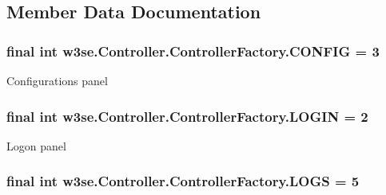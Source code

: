 \subsection{Member Data Documentation}
\hypertarget{classw3se_1_1_controller_1_1_controller_factory_ae4a2c6a73c4e48952bbace51e7ab0c03}{
\subsubsection[{C\-O\-N\-F\-I\-G}]{\setlength{\rightskip}{0pt plus 5cm}final int w3se.\-Controller.\-Controller\-Factory.\-C\-O\-N\-F\-I\-G = 3\hspace{0.3cm}{\ttfamily [static]}}}\label{classw3se_1_1_controller_1_1_controller_factory_ae4a2c6a73c4e48952bbace51e7ab0c03}
Configurations panel \hypertarget{classw3se_1_1_controller_1_1_controller_factory_ad5cd3960aaaed6a4a1c1e51f5ef0d9bf}{
\subsubsection[{L\-O\-G\-I\-N}]{\setlength{\rightskip}{0pt plus 5cm}final int w3se.\-Controller.\-Controller\-Factory.\-L\-O\-G\-I\-N = 2\hspace{0.3cm}{\ttfamily [static]}}}\label{classw3se_1_1_controller_1_1_controller_factory_ad5cd3960aaaed6a4a1c1e51f5ef0d9bf}
Logon panel \hypertarget{classw3se_1_1_controller_1_1_controller_factory_ad1a630820e7935394c528353839b8380}{
\subsubsection[{L\-O\-G\-S}]{\setlength{\rightskip}{0pt plus 5cm}final int w3se.\-Controller.\-Controller\-Factory.\-L\-O\-G\-S = 5\hspace{0.3cm}{\ttfamily [static]}}}\label{classw3se_1_1_controller_1_1_controller_factory_ad1a630820e7935394c528353839b8380}
